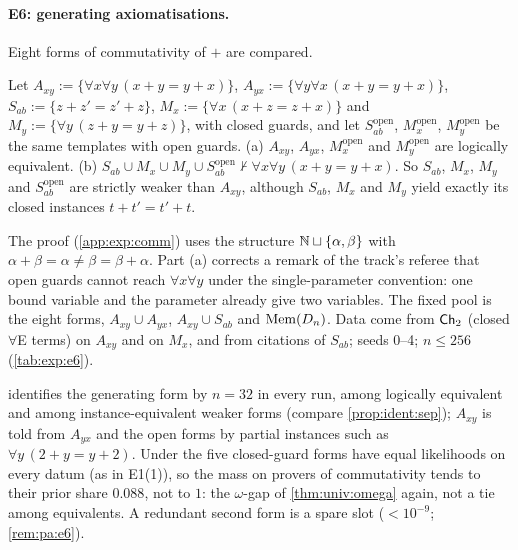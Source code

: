 \paragraph{E6: generating axiomatisations.} Eight forms of commutativity of $+$ are compared.

\begin{proposition}\expbrk{}\label{prop:exp:comm}
Let $A_{xy}:=\{\forall x\forall y\,(x+y=y+x)\}$, $A_{yx}:=\{\forall y\forall x\,(x+y=y+x)\}$, $S_{ab}:=\{z+z'=z'+z\}$, $M_x:=\{\forall x\,(x+z=z+x)\}$ and $M_y:=\{\forall y\,(z+y=y+z)\}$, with closed guards, and let $S_{ab}^{\mathrm{open}}$, $M_x^{\mathrm{open}}$, $M_y^{\mathrm{open}}$ be the same templates with open guards.
\textup{(a)} $A_{xy}$, $A_{yx}$, $M_x^{\mathrm{open}}$ and $M_y^{\mathrm{open}}$ are logically equivalent.
\textup{(b)} $S_{ab}\cup M_x\cup M_y\cup S_{ab}^{\mathrm{open}}\nvdash\forall x\forall y\,(x+y=y+x)$. So $S_{ab}$, $M_x$, $M_y$ and $S_{ab}^{\mathrm{open}}$ are strictly weaker than $A_{xy}$, although $S_{ab}$, $M_x$ and $M_y$ yield exactly its closed instances $t+t'=t'+t$.
\end{proposition}

\noindent The proof (\cref{app:exp:comm}) uses the structure $\mathbb{N}\sqcup\{\alpha,\beta\}$ with $\alpha+\beta=\alpha\ne\beta=\beta+\alpha$. Part (a) corrects a remark of the track's referee that open guards cannot reach $\forall x\forall y$ under the single-parameter convention: one bound variable and the parameter already give two variables. The fixed pool is the eight forms, $A_{xy}\cup A_{yx}$, $A_{xy}\cup S_{ab}$ and $\mathrm{Mem}(D_n)$. Data come from $\mathsf{Ch}_{2}$ (closed $\forall$E terms) on $A_{xy}$ and on $M_x$, and from \Lzero{} citations of $S_{ab}$; seeds 0--4; $n\le256$ (\cref{tab:exp:e6}).

\noindent \Lone{} identifies the generating form by $n=32$ in every run, among logically equivalent and among instance-equivalent weaker forms (compare \cref{prop:ident:sep}); $A_{xy}$ is told from $A_{yx}$ and the open forms by partial instances such as $\forall y\,(2+y=y+2)$. Under \Lselc{} the five closed-guard forms have equal likelihoods on every datum (as in E1(1)), so the mass on provers of commutativity tends to their prior share $0.088$, not to $1$: the $\omega$-gap of \cref{thm:univ:omega} again, not a tie among equivalents. A redundant second form is a spare slot ($<10^{-9}$; \cref{rem:pa:e6}).

